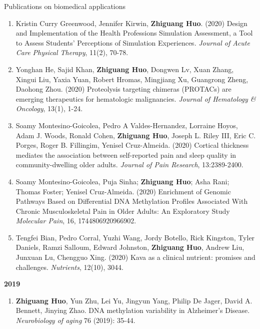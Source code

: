 \documentclass{resume} %
\begin{document}
\begin{rSection}{Publications on biomedical applications}
\begin{enumerate}[noitemsep,topsep=0pt, resume]
\item
Kristin Curry Greenwood,  Jennifer Kirwin, {\bf Zhiguang Huo}. (2020)
Design and Implementation of the Health Professions Simulation Assessment, a Tool to Assess Students' Perceptions of Simulation Experiences. \emph{Journal of Acute Care Physical Therapy}, 11(2), 70-78.


 
\item
Yonghan He, Sajid Khan, {\bf Zhiguang Huo}, Dongwen Lv, Xuan Zhang, Xingui Liu, Yaxia Yuan, Robert Hromas, Mingjiang Xu, Guangrong Zheng, Daohong Zhou. (2020)
Proteolysis targeting chimeras (PROTACs) are emerging therapeutics for hematologic malignancies.
\emph{Journal of Hematology \& Oncology}, 13(1), 1-24.

\item  
Soamy Montesino-Goicolea, Pedro A Valdes-Hernandez,  Lorraine Hoyos, Adam J. Woods, Ronald Cohen,  {\bf Zhiguang Huo}, Joseph L. Riley III, Eric C. Porges, Roger B. Fillingim, Yenisel Cruz-Almeida. (2020)
Cortical thickness mediates the association between self-reported pain and sleep quality in community-dwelling older adults. 
\emph{Journal of Pain Research}, 13:2389-2400.


\item
Soamy Montesino-Goicolea, Puja Sinha; {\bf Zhiguang Huo}; Asha Rani; Thomas Foster; Yenisel Cruz-Almeida. (2020)
Enrichment of Genomic Pathways Based on Differential DNA Methylation Profiles Associated With Chronic Musculoskeletal Pain in Older Adults: An Exploratory Study
\emph{Molecular Pain}, 16, 1744806920966902.

\item  
Tengfei Bian, Pedro Corral, Yuzhi Wang, Jordy Botello, Rick Kingston, Tyler Daniels, Ramzi Salloum, Edward Johnston, {\bf Zhiguang Huo}, Andrew Liu,  Junxuan Lu, Chengguo Xing. (2020)
Kava as a clinical nutrient: promises and challenges.
\emph{Nutrients}, 12(10), 3044.




\end{enumerate}


\textbf{2019}
\begin{enumerate}[noitemsep,topsep=0pt,resume]

\item 
{\bf Zhiguang Huo}, Yun Zhu, Lei Yu, Jingyun Yang, Philip De Jager, David A. Bennett, Jinying Zhao.
 DNA methylation variability in Alzheimer's Disease. \emph{Neurobiology of aging} 76 (2019): 35-44.


\end{enumerate}
\end{rSection}
\end{document}
